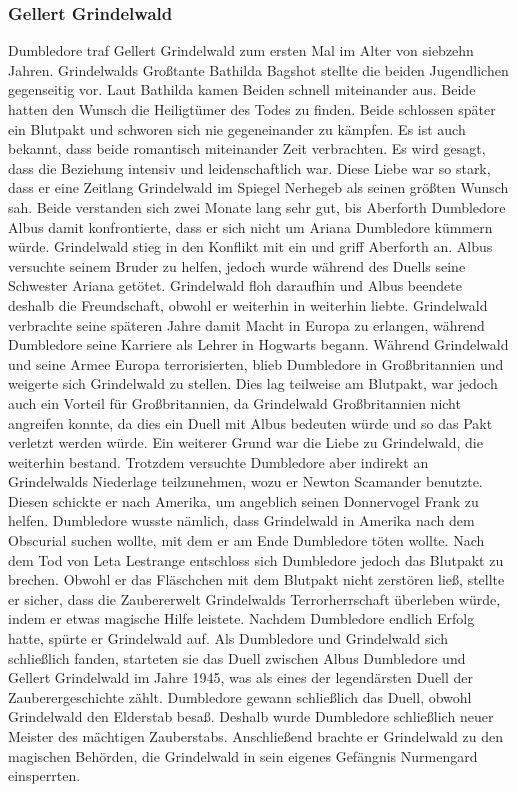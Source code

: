 \documentclass[a4paper, 10pt]{article}
\begin{document}
\subsubsection*{\large Gellert Grindelwald}
Dumbledore traf Gellert Grindelwald zum ersten Mal im Alter von siebzehn Jahren. Grindelwalds Großtante Bathilda Bagshot stellte die beiden Jugendlichen gegenseitig vor. Laut Bathilda kamen Beiden schnell miteinander aus. Beide hatten den Wunsch die Heiligtümer des Todes zu finden. Beide schlossen später ein Blutpakt und schworen sich nie gegeneinander zu kämpfen. Es ist auch bekannt, dass beide romantisch miteinander Zeit verbrachten. Es wird gesagt, dass die Beziehung intensiv und leidenschaftlich war. Diese Liebe war so stark, dass er eine Zeitlang Grindelwald im Spiegel Nerhegeb als seinen größten Wunsch sah.
\vspace{10pt}
\newline
Beide verstanden sich zwei Monate lang sehr gut, bis Aberforth Dumbledore Albus damit konfrontierte, dass er sich nicht um Ariana Dumbledore kümmern würde. Grindelwald stieg in den Konflikt mit ein und griff Aberforth an. Albus versuchte seinem Bruder zu helfen, jedoch wurde während des Duells seine Schwester Ariana getötet. Grindelwald floh daraufhin und Albus beendete deshalb die Freundschaft, obwohl er weiterhin in weiterhin liebte.
\vspace{10pt}
\newline
Grindelwald verbrachte seine späteren Jahre damit Macht in Europa zu erlangen, während Dumbledore seine Karriere als Lehrer in Hogwarts begann. Während Grindelwald und seine Armee Europa terrorisierten, blieb Dumbledore in Großbritannien und weigerte sich Grindelwald zu stellen. Dies lag teilweise am Blutpakt, war jedoch auch ein Vorteil für Großbritannien, da Grindelwald Großbritannien nicht angreifen konnte, da dies ein Duell mit Albus bedeuten würde und so das Pakt verletzt werden würde. Ein weiterer Grund war die Liebe zu Grindelwald, die weiterhin bestand. Trotzdem versuchte Dumbledore aber indirekt an Grindelwalds Niederlage teilzunehmen, wozu er Newton Scamander benutzte. Diesen schickte er nach Amerika, um angeblich seinen Donnervogel Frank zu helfen. Dumbledore wusste nämlich, dass Grindelwald in Amerika nach dem Obscurial suchen wollte, mit dem er am Ende Dumbledore töten wollte. Nach dem Tod von Leta Lestrange entschloss sich Dumbledore jedoch das Blutpakt zu brechen.
\vspace{10pt}
\newline
Obwohl er das Fläschchen mit dem Blutpakt nicht zerstören ließ, stellte er sicher, dass die Zaubererwelt Grindelwalds Terrorherrschaft überleben würde, indem er etwas magische Hilfe leistete. Nachdem Dumbledore endlich Erfolg hatte, spürte er Grindelwald auf. Als Dumbledore und Grindelwald sich schließlich fanden, starteten sie das Duell zwischen Albus Dumbledore und Gellert Grindelwald im Jahre 1945, was als eines der legendärsten Duell der Zauberergeschichte zählt. Dumbledore gewann schließlich das Duell, obwohl Grindelwald den Elderstab besaß. Deshalb wurde Dumbledore schließlich neuer Meister des mächtigen Zauberstabs. Anschließend brachte er Grindelwald zu den magischen Behörden, die Grindelwald in sein eigenes Gefängnis Nurmengard einsperrten.
\end{document}
